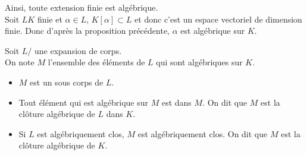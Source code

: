 \begin{remarque}
	Ainsi, toute extension finie est algébrique. \\
	Soit $LK$ finie et $\alpha \in L$, $K[\alpha] \subset L$ et donc c'est un espace vectoriel de dimension finie. Donc d'après la proposition précédente, $\alpha$ est algébrique sur $K$.
\end{remarque}

\begin{theorem}
	Soit $L/$ une expansion de corps. \\
	On note $M$ l'ensemble des éléments de $L$ qui sont algébriques sur $K$.
	\begin{itemize}
		\item $M$ est un sous corps de $L$.
		\item Tout élément qui est algébrique sur $M$ est dans $M$. On dit que $M$ est la clôture algébrique de $L$ dans $K$.
		\item Si $L$ est algébriquement clos, $M$ est algébriquement clos. On dit que $M$ est la clôture algébrique de $K$.
	\end{itemize}
\end{theorem}




